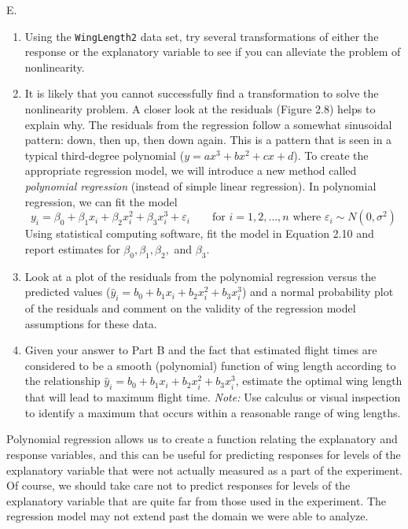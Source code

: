 \documentclass[
]{report}
\newcounter{excount}
\renewcommand{\theexcount}{E\arabic{excount}}
\begin{document}
\begin{list}{\theexcount.}{ \setlength{\itemsep}{1.2em}}
    \begin{enumerate}
      \item Using the \texttt{WingLength2} data set, try several transformations of either the response or the explanatory variable to see if you can alleviate the problem of nonlinearity.
      \item It is likely that you cannot successfully find a transformation to solve the nonlinearity problem. A closer look at the residuals (Figure 2.8) helps to explain why. The residuals from the regression follow a somewhat sinusoidal pattern: down, then up, then down again. This is a pattern that is seen in a typical third-degree polynomial ($y = a x^3 + b x^2 + c x + d$). To create the appropriate regression model, we will introduce a new method called \textit{polynomial regression} (instead of simple linear regression). In polynomial regression, we can fit the model
      \[ \label{2.10}
        y_i = \beta_0 + \beta_1 x_i + \beta_2 x_i^2 + \beta_3 x_i^3 + \varepsilon_i \qquad \text{for } i = 1, 2, \ldots, n \text{ where } \varepsilon_i \sim N(0, \sigma^2)
        \tag{2.10}
      \]
      Using statistical computing software, fit the model in Equation 2.10 and report estimates for $\beta_0, \beta_1, \beta_2,$ and $\beta_3$.
      \item Look at a plot of the residuals from the polynomial regression versus the predicted values ($\hat{y}_i = b_0 + b_1 x_i + b_2 x_i^2 + b_3 x_i^3$) and a normal probability plot of the residuals and comment on the validity of the regression model assumptions for these data.
      \item Given your answer to Part B and the fact that estimated flight times are considered to be a smooth (polynomial) function of wing length according to the relationship $\hat{y}_i = b_0 + b_1 x_i + b_2 x_i^2 + b_3 x_i^3$, estimate the optimal wing length that will lead to maximum flight time. \textit{Note:} Use calculus or visual inspection to identify a maximum that occurs within a reasonable range of wing lengths.
    \end{enumerate}

Polynomial regression allows us to create a function relating the explanatory and response variables, and this can be useful for predicting responses for levels of the explanatory variable that were not actually measured as a part of the experiment. Of course, we should take care not to predict responses for levels of the explanatory variable that are quite far from those used in the experiment. The regression model may not extend past the domain we were able to analyze.

\end{list}
\end{document}
